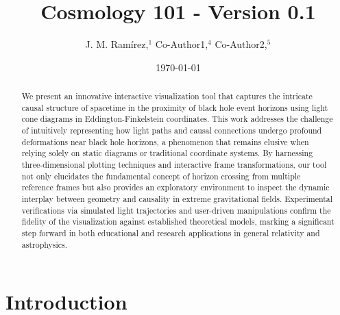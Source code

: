 \documentclass{article}
\title{Cosmology 101 - Version 0.1}
\author{J. M. Ram{\'i}rez,$^{1}$ Co-Author1,$^{4}$ Co-Author2,$^{5}$}
\date{\today}
\begin{document}
\maketitle\begin{abstract}
We present an innovative interactive visualization tool that captures the intricate causal structure of spacetime in the proximity of black hole event horizons using light cone diagrams in Eddington-Finkelstein coordinates. This work addresses the challenge of intuitively representing how light paths and causal connections undergo profound deformations near black hole horizons, a phenomenon that remains elusive when relying solely on static diagrams or traditional coordinate systems. By harnessing three-dimensional plotting techniques and interactive frame transformations, our tool not only elucidates the fundamental concept of horizon crossing from multiple reference frames but also provides an exploratory environment to inspect the dynamic interplay between geometry and causality in extreme gravitational fields. Experimental verifications via simulated light trajectories and user-driven manipulations confirm the fidelity of the visualization against established theoretical models, marking a significant step forward in both educational and research applications in general relativity and astrophysics.
\end{abstract}\section{Introduction}
\end{document}
